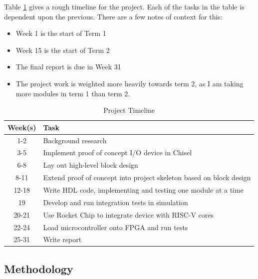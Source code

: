 \documentclass[a4paper,fleqn,12pt]{article}
\begin{document}
Table \ref{tab:timeline} gives a rough timeline for the project. Each of the tasks in the table is dependent upon the previous. There are a few notes of context for this:

\begin{itemize}
    \item Week 1 is the start of Term 1
    \item Week 15 is the start of Term 2
    \item The final report is due in Week 31
    \item The project work is weighted more heavily towards term 2, as I am taking more modules in term 1 than term 2.
\end{itemize}


\begin{table}[ht!]
    \centering
    \begin{tabular}{|c|l|}
        \hline
        \textbf{Week(s)} & \textbf{Task}                                                       \\ \hline
        1-2              & Background research                                                 \\ \hline
        3-5              & Implement proof of concept I/O device in Chisel                     \\ \hline
        6-8              & Lay out high-level block design                                     \\ \hline
        8-11             & Extend proof of concept into project skeleton based on block design \\ \hline
        12-18            & Write HDL code, implementing and testing one module at a time       \\ \hline
        19               & Develop and run integration tests in simulation                     \\ \hline
        20-21            & Use Rocket Chip to integrate device with RISC-V cores               \\ \hline
        22-24            & Load microcontroller onto FPGA and run tests                        \\ \hline
        25-31            & Write report                                                        \\ \hline
    \end{tabular}
    \caption{Project Timeline}
    \label{tab:timeline}
\end{table}

\subsection{Methodology}
\end{document}

